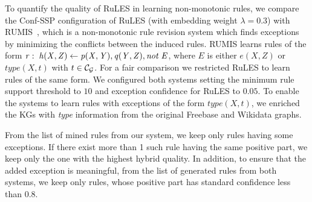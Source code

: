 
To quantify the quality of RuLES in learning non-monotonic rules, we compare the Conf-SSP configuration of RuLES (with embedding weight $\lambda = 0.3$) with RUMIS~\cite{trantowards}, which is a non-monotonic rule revision system which finds exceptions by minimizing the conflicts between the induced rules. RUMIS learns rules %
of the form %
$\mathit{r:\;h(X,Z) \leftarrow p(X,Y), q(Y,Z), not\; E}$, where $E$ is either $e(X,Z)$ or $\textit{type}(X,t)$ %
with $t\in \mathcal{C}_{\mathcal{G}}$.
For a fair comparison we restricted RuLES to learn rules of the same form. %
We configured both systems %
setting the minimum rule support threshold to %
$10$ and exception confidence for RuLES to $0.05$. %
To enable the systems to %
learn rules with exceptions of the form %
$\textit{type}(X,t)$, we enriched the KGs with \textit{type} information from the original Freebase and Wikidata graphs. %






From the list of mined rules from our system, we keep only rules having some exceptions. If there exist more than 1 such rule having the same positive part, we keep only the one with the highest hybrid quality. In addition, to ensure that the added exception is meaningful, from the list of generated rules from both systems, we keep only rules, whose positive part has standard confidence less than 0.8.

